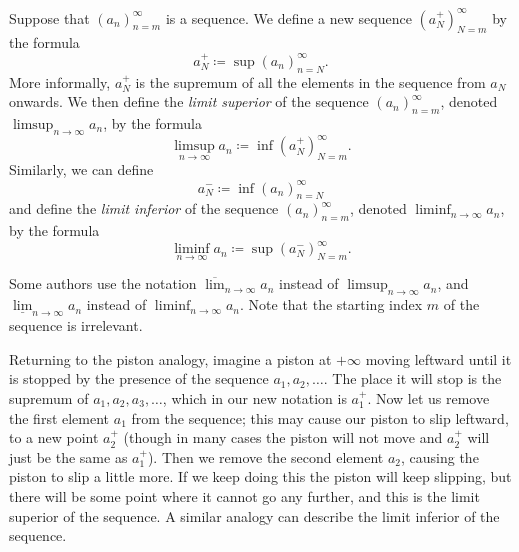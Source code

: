 \begin{definition}\label{6.4.6}
    Suppose that \((a_n)_{n = m}^\infty\) is a sequence.
    We define a new sequence \((a_N^+)_{N = m}^\infty\) by the formula
    \[
        a_N^+ \coloneqq \sup(a_n)_{n = N}^\infty.
    \]
    More informally, \(a_N^+\) is the supremum of all the elements in the sequence from \(a_N\) onwards.
    We then define the \emph{limit superior} of the sequence \((a_n)_{n = m}^\infty\), denoted \(\limsup_{n \to \infty} a_n\), by the formula
    \[
        \limsup_{n \to \infty} a_n \coloneqq \inf(a_N^+)_{N = m}^\infty.
    \]
    Similarly, we can define
    \[
        a_N^- \coloneqq \inf(a_n)_{n = N}^\infty
    \]
    and define the \emph{limit inferior} of the sequence \((a_n)_{n = m}^\infty\), denoted \(\liminf_{n \to \infty} a_n\), by the formula
    \[
        \liminf_{n \to \infty} a_n \coloneqq \sup(a_N^-)_{N = m}^\infty.
    \]
\end{definition}

\setcounter{theorem}{10}
\begin{remark}\label{6.4.11}
    Some authors use the notation \(\overline{\lim}_{n \to \infty} a_n\) instead of \(\limsup_{n \to \infty} a_n\), and \(\underline{\lim}_{n \to \infty} a_n\) instead of \(\liminf_{n \to \infty} a_n\).
    Note that the starting index \(m\) of the sequence is irrelevant.
\end{remark}

\begin{note}
    Returning to the piston analogy, imagine a piston at \(+\infty\) moving leftward until it is stopped by the presence of the sequence \(a_1, a_2, \dots\).
    The place it will stop is the supremum of \(a_1, a_2, a_3, \dots\), which in our new notation is \(a_1^+\).
    Now let us remove the first element \(a_1\) from the sequence;
    this may cause our piston to slip leftward, to a new point \(a_2^+\)
    (though in many cases the piston will not move and \(a_2^+\) will just be the same as \(a_1^+\)).
    Then we remove the second element \(a_2\), causing the piston to slip a little more.
    If we keep doing this the piston will keep slipping, but there will be some point where it cannot go any further, and this is the limit superior of the sequence.
    A similar analogy can describe the limit inferior of the sequence.
\end{note}

